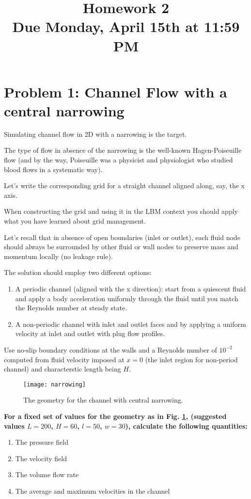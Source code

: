 \documentclass[11pt]{article}
\title{Homework 2 \\[1.0em] \normalsize Due Monday, April 15th at 11:59 PM}
\date{}
\begin{document}
  \maketitle

  \section{Problem 1:  Channel Flow with a central narrowing}
    Simulating channel flow in 2D with a narrowing is the target.

The type of flow in absence of the narrowing is the well-known Hagen-Poiseuille flow 
(and by the way, Poiseuille was a physicist and physiologist who studied blood flows 
in a systematic way).

Let's write the corresponding grid for a straight channel aligned along, say, the x axis. 

When constructing the grid and using it in the LBM context 
you should apply what you have learned about grid management. 

Let's recall that in absence of open boundaries (inlet or outlet), each fluid node should always 
be surrounded by other fluid or wall nodes to preserve mass and momentum locally (no leakage rule).

The solution should employ two different options:

    \begin{enumerate}
      \item A periodic channel (aligned with the x direction): start from a quiescent fluid and
      apply a body acceleration uniformly through the fluid until you match the Reynolds number at steady state.
      \item A non-periodic channel with inlet and outlet faces and by applying a uniform velocity 
      at inlet and outlet with plug flow profiles.
    \end{enumerate}

    Use no-slip boundary conditions at the walls and a Reynolds number of $10^{-2}$ computed from fluid velocity 
    imposed at $x=0$ (the inlet region for non-period channel) and characterstic length being $H$.

    \begin{figure}[h!]
      \centering{}\texttt{[image: narrowing]}
      \caption{The geometry for the channel with central narrowing.}
      \label{fig:narrowing}
    \end{figure}

    
    \textbf{For a fixed set of values for the geometry 
    as in Fig. \ref{fig:narrowing}, (suggested values $L=200$, $H=60$, $l=50$, $w=30$), 
    calculate the following quantities:}
    \begin{enumerate}
      \item The pressure field
      \item The velocity field 
      \item The volume flow rate 
      \item The average and maximum velocities in the channel
    \end{enumerate}
\end{document}
